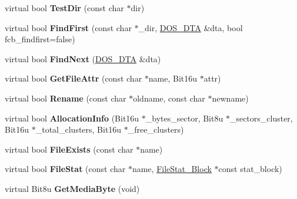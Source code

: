 \begin{DoxyCompactItemize}
\item 
\hypertarget{classfatDrive_a3be370f09c1c3a5c88381b86d180c627}{virtual bool {\bfseries Test\-Dir} (const char $\ast$dir)}\label{classfatDrive_a3be370f09c1c3a5c88381b86d180c627}

\item 
\hypertarget{classfatDrive_ae6a1a651216a72b1aa23172aca4793db}{virtual bool {\bfseries Find\-First} (const char $\ast$\-\_\-dir, \hyperlink{classDOS__DTA}{D\-O\-S\-\_\-\-D\-T\-A} \&dta, bool fcb\-\_\-findfirst=false)}\label{classfatDrive_ae6a1a651216a72b1aa23172aca4793db}

\item 
\hypertarget{classfatDrive_aa42a5640691796f7d1fef063b92dc418}{virtual bool {\bfseries Find\-Next} (\hyperlink{classDOS__DTA}{D\-O\-S\-\_\-\-D\-T\-A} \&dta)}\label{classfatDrive_aa42a5640691796f7d1fef063b92dc418}

\item 
\hypertarget{classfatDrive_a5849a5af82e7d7a273e6096aa08d220b}{virtual bool {\bfseries Get\-File\-Attr} (const char $\ast$name, Bit16u $\ast$attr)}\label{classfatDrive_a5849a5af82e7d7a273e6096aa08d220b}

\item 
\hypertarget{classfatDrive_a280a53447052bc89d35e281e3180c281}{virtual bool {\bfseries Rename} (const char $\ast$oldname, const char $\ast$newname)}\label{classfatDrive_a280a53447052bc89d35e281e3180c281}

\item 
\hypertarget{classfatDrive_a89089651094073f2d5257e187fe10403}{virtual bool {\bfseries Allocation\-Info} (Bit16u $\ast$\-\_\-bytes\-\_\-sector, Bit8u $\ast$\-\_\-sectors\-\_\-cluster, Bit16u $\ast$\-\_\-total\-\_\-clusters, Bit16u $\ast$\-\_\-free\-\_\-clusters)}\label{classfatDrive_a89089651094073f2d5257e187fe10403}

\item 
\hypertarget{classfatDrive_a87594730a6f5c10a579a9e236ada21e9}{virtual bool {\bfseries File\-Exists} (const char $\ast$name)}\label{classfatDrive_a87594730a6f5c10a579a9e236ada21e9}

\item 
\hypertarget{classfatDrive_a10053899bc9ca84a4c99ca5ee5c0716e}{virtual bool {\bfseries File\-Stat} (const char $\ast$name, \hyperlink{structFileStat__Block}{File\-Stat\-\_\-\-Block} $\ast$const stat\-\_\-block)}\label{classfatDrive_a10053899bc9ca84a4c99ca5ee5c0716e}

\item 
\hypertarget{classfatDrive_ad9980844fab3303927f2118d02d55147}{virtual Bit8u {\bfseries Get\-Media\-Byte} (void)}\label{classfatDrive_ad9980844fab3303927f2118d02d55147}


\end{DoxyCompactItemize}
